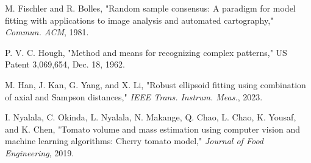 \begin{thebibliography}{12}
 M. Fischler and R. Bolles, "Random sample consensus: A paradigm for model fitting with applications to image analysis and automated cartography," \textit{Commun. ACM}, 1981.

 P. V. C. Hough,  
"Method and means for recognizing complex patterns,"  
US Patent 3,069,654, Dec. 18, 1962.

 M. Han, J. Kan, G. Yang, and X. Li, "Robust ellipsoid fitting using combination of axial and Sampson distances," \textit{IEEE Trans. Instrum. Meas.}, 2023.

 I. Nyalala, C. Okinda, L. Nyalala, N. Makange, Q. Chao, L. Chao, K. Yousaf, and K. Chen, "Tomato volume and mass estimation using computer vision and machine learning algorithms: Cherry tomato model," \textit{Journal of Food Engineering}, 2019.








\end{thebibliography}
